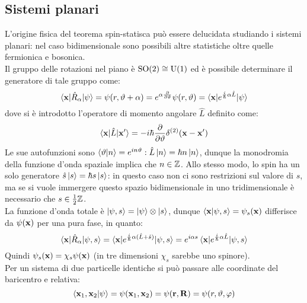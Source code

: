 \subsection{Sistemi planari}

L'origine fisica del teorema spin-statisca può essere delucidata studiando i sistemi planari: nel caso bidimensionale sono possibili altre statistiche oltre quelle fermionica e bosonica.\\
Il gruppo delle rotazioni nel piano è $ \mathrm{SO}(2) \cong \mathrm{U}(1) $ ed è possibile determinare il generatore di tale gruppo come:
\begin{equation*}
	\braket{\mathbf{x} | \hat{R}_\alpha | \psi} = \psi(r, \vartheta + \alpha) = e^{\alpha \frac{\partial}{\partial \vartheta}} \psi(r, \vartheta) = \braket{\mathbf{x} | e^{\frac{i}{\hbar} \alpha \hat{L}} | \psi}
\end{equation*}
dove si è introdotto l'operatore di momento angolare $ \hat{L} $ definito come:
\begin{equation*}
	\braket{\mathbf{x} | \hat{L} | \mathbf{x}'} = - i \hbar \frac{\partial}{\partial \vartheta} \delta^{(2)}(\mathbf{x} - \mathbf{x}')
\end{equation*}
Le sue autofunzioni sono $ \braket{\vartheta | n} = e^{in \vartheta} : \hat{L} \ket{n} = \hbar n \ket{n} $, dunque la monodromia della funzione d'onda spaziale implica che $ n \in \mathbb{Z} $. Allo stesso modo, lo spin ha un solo generatore $ \hat{s} \ket{s} = \hbar s \ket{s} $: in questo caso non ci sono restrizioni sul valore di $ s $, ma se si vuole immergere questo spazio bidimensionale in uno tridimensionale è necessario che $ s \in \frac{1}{2} \mathbb{Z} $.\\
La funzione d'onda totale è $ \ket{\psi,s} = \ket{\psi} \otimes \ket{s} $, dunque $ \braket{\mathbf{x} | \psi, s} = \psi_s(\mathbf{x}) $ differisce da $ \psi(\mathbf{x}) $ per una pura fase, in quanto:
\begin{equation*}
	\braket{\mathbf{x} | \hat{R}_\alpha | \psi,s} = \braket{\mathbf{x} | e^{\frac{i}{\hbar} \alpha (\hat{L} + \hat{s})} | \psi,s} = e^{i \alpha s} \braket{\mathbf{x} | e^{\frac{i}{\hbar} \alpha \hat{L}} | \psi,s}
\end{equation*}
Quindi $ \psi_s(\mathbf{x}) = \chi_s \psi(\mathbf{x}) $ (in tre dimensioni $ \chi_s $ sarebbe uno spinore).\\
Per un sistema di due particelle identiche si può passare alle coordinate del baricentro e relativa:
\begin{equation*}
	\braket{\mathbf{x}_1, \mathbf{x}_2 | \psi} = \psi(\mathbf{x}_1, \mathbf{x}_2) = \psi(\mathbf{r},\mathbf{R}) = \psi(r, \vartheta, \varphi)
\end{equation*}

